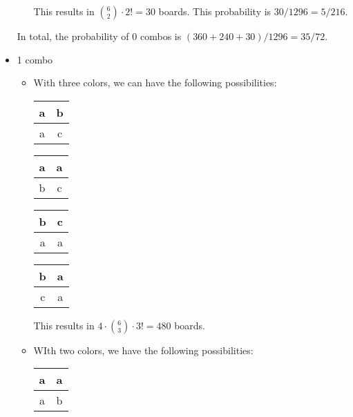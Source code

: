 \documentclass[12pt]{article}
\begin{document}
\begin{itemize}
\begin{itemize}
\begin{center}
\begin{tabular}{|c|c|}
            \end{tabular}
        \end{center}
        This results in $\binom{6}{2}\cdot 2!=30$ boards.
        This probability is $30/1296=5/216$.
    \end{itemize}
    In total, the probability of 0 combos is $(360+240+30)/1296=35/72$.
    \item 1 combo
    \begin{itemize}
        \item With three colors, we can have the following possibilities:
        \begin{center}
            \begin{tabular}{|c|c|}
            \hline
            a & b \\
            \hline
            a & c \\
            \hline
            \end{tabular}
            \quad
            \begin{tabular}{|c|c|}
            \hline
            a & a \\
            \hline
            b & c \\
            \hline
            \end{tabular}
            \quad
            \begin{tabular}{|c|c|}
            \hline
            b & c \\
            \hline
            a & a \\
            \hline
            \end{tabular}
            \quad
            \begin{tabular}{|c|c|}
            \hline
            b & a \\
            \hline
            c & a \\
            \hline
            \end{tabular}
        \end{center}
        This results in $4\cdot \binom{6}{3}\cdot 3!=480$ boards.
        \item WIth two colors, we have the following possibilities:
        \begin{center}
            \begin{tabular}{|c|c|}
            \hline
            a & a \\
            \hline
            a & b \\
            \hline
            \end{tabular}

\end{center}
\end{itemize}
\end{itemize}
\end{document}
